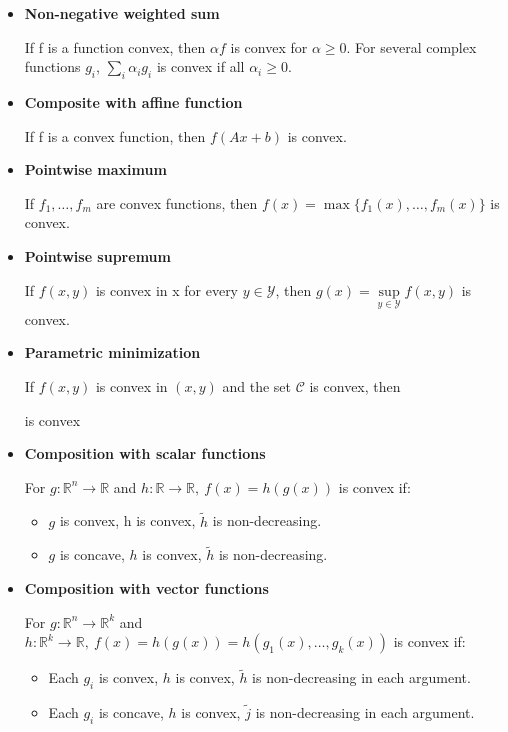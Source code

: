 \documentclass[8pt,a4paper]{scrartcl}
\begin{document}
\begin{multicols*}{3}
\begin{itemize}
\ncompaq
\item \textbf{Non-negative weighted sum}

If f is a function convex, then $\alpha f$ is convex for $\alpha\geq 0$. For several complex functions $g_i$, $\sum_i\alpha_i g_i$ is convex if all $\alpha_i\geq 0$.

\item \textbf{Composite with affine function}

If f is a convex function, then $f(Ax+b)$ is convex.

\item \textbf{Pointwise maximum}

If $f_1,\ldots,f_m$ are convex functions, then $f(x)=\max\{f_1(x),\ldots,f_m(x)\}$ is convex.

\item \textbf{Pointwise supremum}

If $f(x,y)$ is convex in x for every $y\in\mathcal{Y}$, then $g(x)=\sup\limits_{y\in\mathcal{Y}}f(x,y)$ is convex.

\item \textbf{Parametric minimization}

If $f(x,y)$ is convex in $(x,y)$ and the set $\mathcal{C}$ is convex, then 


is convex
\item \textbf{Composition with scalar functions}

For $g:\mathbb{R}^n\rightarrow\mathbb{R}$ and $h:\mathbb{R}\rightarrow\mathbb{R},\ f(x)=h(g(x))$ is convex if:

\begin{itemize}
\ncompaq
\item $g$ is convex, h is convex, $\tilde{h}$ is non-decreasing.
\item $g$ is concave, $h$ is convex, $\tilde{h}$ is non-decreasing.
\end{itemize}

\item \textbf{Composition with vector functions}

For $g:\mathbb{R}^n\rightarrow\mathbb{R}^k$ and $h:\mathbb{R}^k\rightarrow \mathbb{R},\ f(x)=h(g(x))=h(g_1(x),\ldots,g_k(x))$ is convex if:

\begin{itemize}
\ncompaq
\item Each $g_i$ is convex, $h$ is convex, $\tilde{h}$ is non-decreasing in each argument.
\item Each $g_i$ is concave, $h$ is convex, $\tilde{j}$ is non-decreasing in each argument.
\end{itemize}
\end{itemize}


\end{multicols*}
\end{document}
